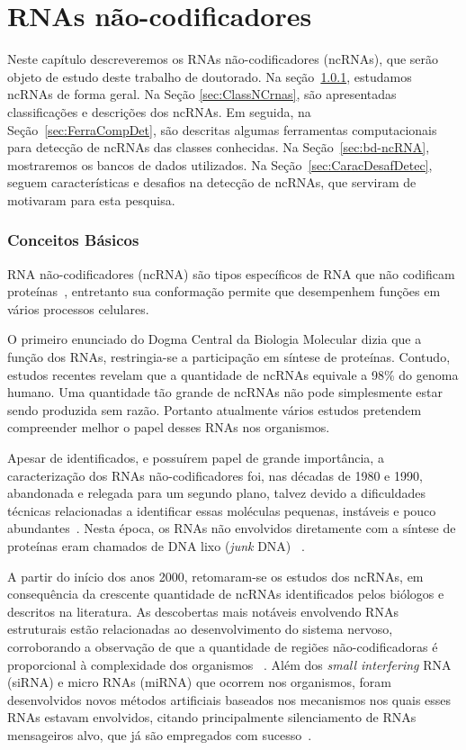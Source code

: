 \chapter{RNAs não-codificadores}
\label{sec:ncRNACodificadores}

Neste capítulo descreveremos os RNAs não-codificadores (ncRNAs), que serão objeto de estudo deste trabalho de doutorado. Na seção~\ref{sec:ConBasico}, estudamos ncRNAs de forma geral. Na Seção \ref{sec:ClassNCrnas}, são apresentadas classificações e descrições dos ncRNAs. Em seguida, na Seção~\ref{sec:FerraCompDet}, são descritas algumas ferramentas computacionais para detecção de ncRNAs das classes conhecidas. Na Seção~\ref{sec:bd-ncRNA}, mostraremos os bancos de dados utilizados. Na Seção~\ref{sec:CaracDesafDetec}, seguem características e desafios na detecção de ncRNAs, que serviram de motivaram para esta pesquisa.


\subsection{Conceitos Básicos} \label{sec:ConBasico}

RNA não-codificadores (ncRNA) são tipos específicos de RNA que não codificam proteínas~\citep{watson1953molecular:1953,eddy2001non:2001}, entretanto sua conformação permite que desempenhem funções em vários processos celulares.

O primeiro enunciado do Dogma Central da Biologia Molecular dizia que a função dos RNAs, restringia-se a participação em síntese de proteínas. Contudo, estudos recentes revelam que a quantidade de ncRNAs equivale a 98\% do genoma humano. Uma quantidade tão grande de ncRNAs não pode simplesmente estar sendo produzida sem razão. Portanto atualmente vários estudos  pretendem compreender melhor o papel desses RNAs nos organismos.

	
Apesar de identificados, e possuírem papel de grande importância, a caracterização dos RNAs não-codificadores foi, nas décadas de 1980 e 1990, abandonada e relegada para um segundo plano, talvez devido a dificuldades técnicas relacionadas a identificar essas moléculas pequenas, instáveis e pouco abundantes~\citep{eddy2001non:2001}. Nesta época, os RNAs não envolvidos diretamente com a síntese de proteínas eram chamados de DNA lixo (\textit{junk} DNA)
~\citep{setubal1997introduction:1997}.


	A partir do início dos anos 2000, retomaram-se os estudos dos ncRNAs, em consequência da crescente quantidade de ncRNAs identificados pelos biólogos e descritos na literatura. As descobertas mais notáveis envolvendo RNAs estruturais estão relacionadas ao desenvolvimento do sistema nervoso, corroborando a observação de que a quantidade de regiões não-codificadoras é proporcional à complexidade dos organismos ~\citep{badger1999critica:1999,mattick2001evolution:2001,mercer2008specific:2008,presutti2006non:2006}. Além dos \textit{small interfering} RNA (siRNA) e micro RNAs (miRNA) que ocorrem nos organismos, foram desenvolvidos novos métodos artificiais baseados nos mecanismos nos quais esses RNAs estavam envolvidos, citando principalmente silenciamento de RNAs mensageiros alvo, que já são empregados com sucesso~\citep{reynolds2004rational:2004}.


